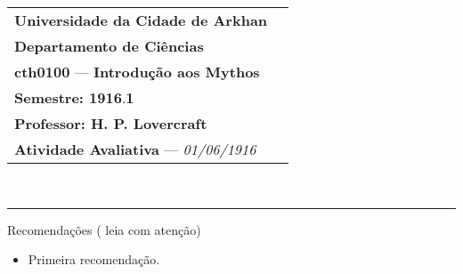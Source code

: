 \documentclass[12pt]{exam}
\newcommand{\university}[1]{\textbf{#1}}
\newcommand{\colleage}[1]{\textbf{#1}}
\newcommand{\course}[2]{\textbf{#1} --- \textbf{#2}}
\newcommand{\period}[2]{\textbf{Semestre: #1}.\textbf{#2}}
\newcommand{\teacher}[1]{\textbf{Professor: #1}}
\newcommand{\examdate}[3]{\textit{#1/#2/#3}}
\begin{document}
	\pagestyle{plain}
	\thispagestyle{empty}
	\noindent
	\begin{tabular*}{\textwidth}{ll}
		\university{Universidade da Cidade de Arkhan}\\
		\colleage{Departamento de Ciências}\\
		\course{cth0100}{Introdução aos Mythos}\\
		\period{1916}{1}\\
		\teacher{H. P. Lovercraft}\\
		\textbf{Atividade Avaliativa} --- \examdate{01}{06}{1916}\\
	\end{tabular*}\\
	\rule[0.1ex]{\textwidth}{1pt}
	\begin{center}
		Recomendações ({\color{red} leia com atenção})
	\end{center}
	\begin{itemize}
		\item Primeira recomendação.
	\end{itemize}
\end{document}
